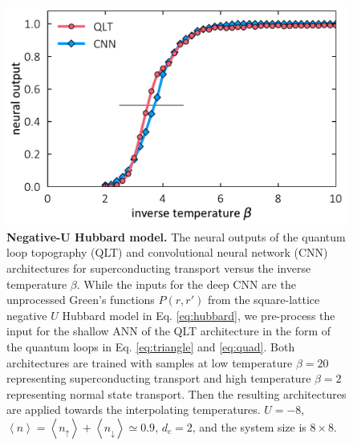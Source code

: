 \documentclass[amsmath,amssymb, aps, prl, twocolumn]{revtex4-1}
\begin{document}

\begin{figure}
\includegraphics[scale=.43]{fig1.pdf}
\caption{
{\bf Negative-U Hubbard model.} The neural outputs of the quantum loop topography (QLT) and convolutional neural network (CNN) architectures for superconducting transport versus the inverse temperature $\beta$. While the inputs for the deep CNN are the unprocessed Green's functions $P(r,r')$ from the square-lattice negative $U$ Hubbard model in Eq. \ref{eq:hubbard}, we pre-process the input for the shallow ANN of the QLT architecture in the form of the quantum loops in Eq. \ref{eq:triangle} and \ref{eq:quad}. Both architectures are trained with samples at low temperature $\beta=20$ representing superconducting transport and high temperature $\beta=2$ representing normal state transport. Then the resulting architectures are applied towards the interpolating temperatures. $U=-8$, $\left\langle n\right\rangle= \left\langle n_\uparrow\right\rangle+\left\langle n_\downarrow\right\rangle\simeq 0.9$, $d_c=2$, and the system size is $8\times 8$. }\label{fig:hubbard}
\end{figure}
\end{document}
